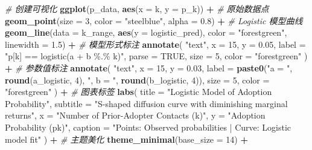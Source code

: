 \documentclass[
]{article}
\newenvironment{Shaded}{\begin{snugshade}}{\end{snugshade}}
\newcommand{\AttributeTok}[1]{\textcolor[rgb]{0.13,0.29,0.53}{#1}}
\newcommand{\CommentTok}[1]{\textcolor[rgb]{0.56,0.35,0.01}{\textit{#1}}}
\newcommand{\ConstantTok}[1]{\textcolor[rgb]{0.56,0.35,0.01}{#1}}
\newcommand{\DecValTok}[1]{\textcolor[rgb]{0.00,0.00,0.81}{#1}}
\newcommand{\FloatTok}[1]{\textcolor[rgb]{0.00,0.00,0.81}{#1}}
\newcommand{\FunctionTok}[1]{\textcolor[rgb]{0.13,0.29,0.53}{\textbf{#1}}}
\newcommand{\NormalTok}[1]{#1}
\newcommand{\SpecialCharTok}[1]{\textcolor[rgb]{0.81,0.36,0.00}{\textbf{#1}}}
\newcommand{\StringTok}[1]{\textcolor[rgb]{0.31,0.60,0.02}{#1}}
\begin{document}
\begin{Shaded}
\begin{Highlighting}[]
\CommentTok{\# 创建可视化}
\FunctionTok{ggplot}\NormalTok{(p\_data, }\FunctionTok{aes}\NormalTok{(}\AttributeTok{x =}\NormalTok{ k, }\AttributeTok{y =}\NormalTok{ p\_k)) }\SpecialCharTok{+}
  \CommentTok{\# 原始数据点}
  \FunctionTok{geom\_point}\NormalTok{(}\AttributeTok{size =} \DecValTok{3}\NormalTok{, }\AttributeTok{color =} \StringTok{"steelblue"}\NormalTok{, }\AttributeTok{alpha =} \FloatTok{0.8}\NormalTok{) }\SpecialCharTok{+}
  \CommentTok{\# Logistic 模型曲线}
  \FunctionTok{geom\_line}\NormalTok{(}\AttributeTok{data =}\NormalTok{ k\_range, }\FunctionTok{aes}\NormalTok{(}\AttributeTok{y =}\NormalTok{ logistic\_pred), }
            \AttributeTok{color =} \StringTok{"forestgreen"}\NormalTok{, }\AttributeTok{linewidth =} \FloatTok{1.5}\NormalTok{) }\SpecialCharTok{+}
  \CommentTok{\# 模型形式标注}
  \FunctionTok{annotate}\NormalTok{(}
    \StringTok{"text"}\NormalTok{,}
    \AttributeTok{x =} \DecValTok{15}\NormalTok{,}
    \AttributeTok{y =} \FloatTok{0.05}\NormalTok{,}
    \AttributeTok{label =} \StringTok{"p[k] == logistic(a + b \%.\% k)"}\NormalTok{,}
    \AttributeTok{parse =} \ConstantTok{TRUE}\NormalTok{,}
    \AttributeTok{size =} \DecValTok{5}\NormalTok{,}
    \AttributeTok{color =} \StringTok{"forestgreen"}
\NormalTok{  ) }\SpecialCharTok{+}
  \CommentTok{\# 参数值标注}
  \FunctionTok{annotate}\NormalTok{(}
    \StringTok{"text"}\NormalTok{,}
    \AttributeTok{x =} \DecValTok{15}\NormalTok{,}
    \AttributeTok{y =} \FloatTok{0.03}\NormalTok{,}
    \AttributeTok{label =} \FunctionTok{paste0}\NormalTok{(}\StringTok{"a = "}\NormalTok{, }\FunctionTok{round}\NormalTok{(a\_logistic, }\DecValTok{4}\NormalTok{), }\StringTok{", b = "}\NormalTok{, }\FunctionTok{round}\NormalTok{(b\_logistic, }\DecValTok{4}\NormalTok{)),}
    \AttributeTok{size =} \DecValTok{5}\NormalTok{,}
    \AttributeTok{color =} \StringTok{"forestgreen"}
\NormalTok{  ) }\SpecialCharTok{+}
  \CommentTok{\# 图表标签}
  \FunctionTok{labs}\NormalTok{(}
    \AttributeTok{title =} \StringTok{"Logistic Model of Adoption Probability"}\NormalTok{,}
    \AttributeTok{subtitle =} \StringTok{"S{-}shaped diffusion curve with diminishing marginal returns"}\NormalTok{,}
    \AttributeTok{x =} \StringTok{"Number of Prior{-}Adopter Contacts (k)"}\NormalTok{,}
    \AttributeTok{y =} \StringTok{"Adoption Probability (pk)"}\NormalTok{,}
    \AttributeTok{caption =} \StringTok{"Points: Observed probabilities | Curve: Logistic model fit"}
\NormalTok{  ) }\SpecialCharTok{+}
  \CommentTok{\# 主题美化}
  \FunctionTok{theme\_minimal}\NormalTok{(}\AttributeTok{base\_size =} \DecValTok{14}\NormalTok{) }\SpecialCharTok{+}

\end{Highlighting}
\end{Shaded}
\end{document}
